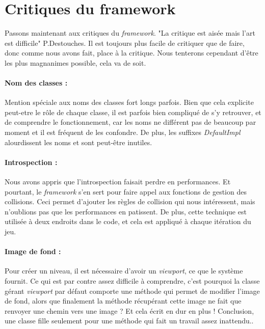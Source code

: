 \documentclass[a4paper,10pt]{article}
\begin{document}
\section{Critiques du framework }
    Passons maintenant aux critiques du \textit{framework}. "La critique est aisée mais l'art est difficile" P.Destouches.
    Il est toujours plus facile de critiquer que de faire, donc comme nous avons fait, place à la critique. Nous tenterons
    cependant d'être les plus magnanimes possible, cela va de soit.
    
    \paragraph{Nom des classes : }
        Mention spéciale aux noms des classes fort longs parfois. Bien que cela explicite peut-etre le rôle
        de chaque classe, il est parfois bien compliqué de s'y retrouver, et de comprendre le fonctionnement,
        car les noms ne différent pas de beaucoup par moment et il est fréquent de les confondre. 
        De plus, les suffixes \textit{DefaultImpl} alourdissent les noms et sont peut-être inutiles.

    \paragraph{Introspection : }
       	 Nous avons appris que l'introspection faisait perdre en performances. Et pourtant, le \textit{framework} s'en sert
        pour faire appel aux fonctions de gestion des collisions. Ceci permet d'ajouter les règles de collision
        qui nous intéressent, mais n'oublions pas que les performances en patissent. De plus, cette technique est
        utilisée à deux endroits dans le code, et cela est appliqué à chaque itération du jeu.

    \paragraph{Image de fond : }
        Pour créer un niveau, il est nécessaire d'avoir un \textit{viewport}, ce que le système fournit. Ce qui est
        par contre assez difficile à comprendre, c'est pourquoi la classe gérant \textit{viewport} par défaut
        comporte une méthode qui permet de modifier l'image de fond, alors que finalement la méthode récupérant
        cette image ne fait que renvoyer une chemin vers une image ? Et cela écrit en dur en plus ! Conclusion, une classe
        fille seulement pour une méthode qui fait un travail assez inattendu..
\end{document}
